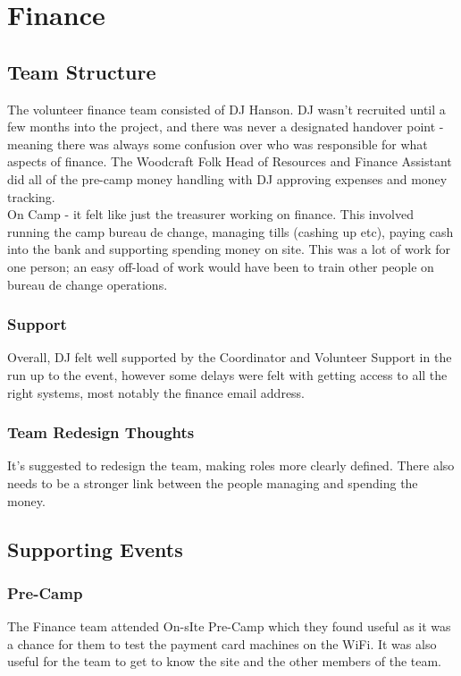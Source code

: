 \chapter{Finance}

\section{Team Structure}
The volunteer finance team consisted of DJ Hanson. DJ wasn't recruited until a few months into the project, and there was never a designated handover point - meaning there was always some confusion over who was responsible for what aspects of finance. The Woodcraft Folk Head of Resources and Finance Assistant did all of the pre-camp money handling with DJ approving expenses and money tracking.\\

On Camp - it felt like just the treasurer working on finance. This involved running the camp bureau de change, managing tills (cashing up etc), paying cash into the bank and supporting spending money on site. This was a lot of work for one person; an easy off-load of work would have been to train other people on bureau de change operations. 
\subsection{Support}
Overall, DJ felt well supported by the Coordinator and Volunteer Support in the run up to the event, however some delays were felt with getting access to all the right systems, most notably the finance email address. 
\subsection{Team Redesign Thoughts}
It's suggested to redesign the team, making roles more clearly defined. There also needs to be a stronger link between the people managing and spending the money.

\section{Supporting Events}
\subsection{Pre-Camp}
The Finance team attended On-sIte Pre-Camp which they found useful as it was a chance for them to test the payment card machines on the WiFi. It was also useful for the team to get to know the site and the other members of the team.


